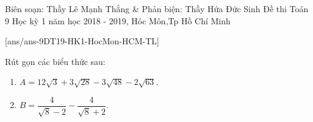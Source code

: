 \begin{name}
{Biên soạn: Thầy Lê Mạnh Thắng \& Phản biện: Thầy Hứa Đức Sinh}
{Đề thi Toán 9 Học kỳ 1 năm học 2018 - 2019, Hóc Môn,Tp Hồ Chí Minh}
\end{name}
\setcounter{bt}{0}
[ans/ans-9DT19-HK1-HocMon-HCM-TL]
\begin{bt}%
	Rút gọn các biểu thức sau:
	\begin{enumerate}
		\item $A=12\sqrt{3}+3\sqrt{28}-3\sqrt{48}-2\sqrt{63}$.
		\item $B=\dfrac{4}{\sqrt{8}-2}-\dfrac{4}{\sqrt{8}+2}$.
	\end{enumerate}
\end{bt}

